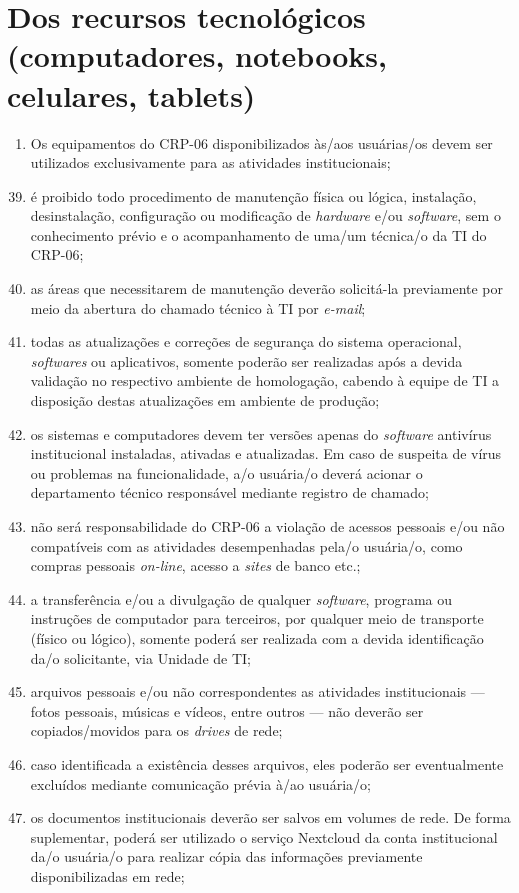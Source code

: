 \documentclass[openright, twoside, a4paper]{memoir}
\begin{document}
\clearpage\chapter{Dos recursos tecnológicos (computadores, notebooks,
celulares,
tablets)}

\begin{enumerate}

\item
    Os equipamentos do CRP-06 disponibilizados às/aos usuárias/os devem
    ser utilizados exclusivamente para as atividades institucionais;
\end{enumerate}

\begin{enumerate}

\setcounter{enumi}{38}
\item
    é proibido todo procedimento de manutenção física ou lógica,
    instalação, desinstalação, configuração ou modificação de
    \emph{hardware} e/ou \emph{software}, sem o conhecimento prévio e o
    acompanhamento de uma/um técnica/o da TI do CRP-06;
\item
    as áreas que necessitarem de manutenção deverão solicitá-la
    previamente por meio da abertura do chamado técnico à TI por
    \emph{e-mail};
\item
    todas as atualizações e correções de segurança do sistema operacional,
    \emph{softwares} ou aplicativos, somente poderão ser realizadas após a
    devida validação no respectivo ambiente de homologação, cabendo à
    equipe de TI a disposição destas atualizações em ambiente de produção;
\item
    os sistemas e computadores devem ter versões apenas do \emph{software}
    antivírus institucional instaladas, ativadas e atualizadas. Em caso de
    suspeita de vírus ou problemas na funcionalidade, a/o usuária/o deverá
    acionar o departamento técnico responsável mediante registro de
    chamado;
\item
    não será responsabilidade do CRP-06 a violação de acessos pessoais
    e/ou não compatíveis com as atividades desempenhadas pela/o usuária/o,
    como compras pessoais \emph{on-line}, acesso a \emph{sites} de banco
    etc.;
\item
    a transferência e/ou a divulgação de qualquer \emph{software},
    programa ou instruções de computador para terceiros, por qualquer meio
    de transporte (físico ou lógico), somente poderá ser realizada com a
    devida identificação da/o solicitante, via Unidade de TI;
\item
    arquivos pessoais e/ou não correspondentes as atividades
    institucionais --- fotos pessoais, músicas e vídeos, entre outros ---
    não deverão ser copiados/movidos para os \emph{drives} de rede;
\item
    caso identificada a existência desses arquivos, eles poderão ser
    eventualmente excluídos mediante comunicação prévia à/ao usuária/o;
\item
    os documentos institucionais deverão ser salvos em volumes de rede. De
    forma suplementar, poderá ser utilizado o serviço Nextcloud da conta
    institucional da/o usuária/o para realizar cópia das informações
    previamente disponibilizadas em rede;


\end{enumerate}
\end{document}
